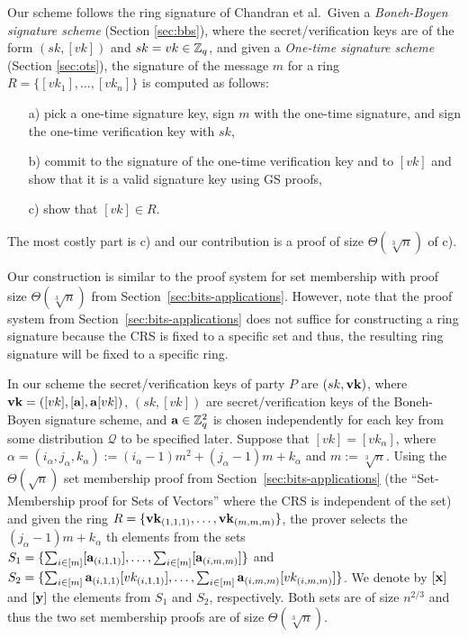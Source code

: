 Our scheme follows the ring signature of Chandran et al.~Given a \emph{Boneh-Boyen signature scheme} (Section \ref{sec:bbs}), where the secret/verification keys are of the form $(sk,[vk])$ and $sk=vk\in\mathbb{Z}_q$, and given a \emph{One-time signature scheme} (Section \ref{sec:ots}), the signature of the message $m$ for a ring $R=\{[vk_1],\ldots,[vk_n]\}$ is computed as follows:
\begin{itemize}
\item[a)] pick a one-time signature key, sign $m$ with the one-time signature, and sign the one-time verification key with $sk$,
\item[b)] commit to the signature of the one-time verification key and to $[vk]$ and show that it is a valid signature key using GS proofs,
\item[c)] show that $[vk]\in R$.
\end{itemize}
The most costly part is c) and our contribution is a proof of size $\Theta(\sqrt[3]{n})$ of c).

Our construction is similar to the proof system for set membership with proof size $\Theta(\sqrt[3]{n})$ from Section~\ref{sec:bits-applications}. However, note that the proof system from Section~\ref{sec:bits-applications} does not suffice for constructing a ring signature because the CRS is fixed to a specific set and thus, the resulting ring signature will be fixed to a specific ring. 

In our scheme the secret/verification keys of party $P$ are $(sk,\mathbf{vk})$, where $\mathbf{vk}=([vk],[\mathbf{a}],\mathbf{a}[vk])$, $(sk,[vk])$ are secret/verification keys of the Boneh-Boyen signature scheme, and $\mathbf{a}\in\mathbb{Z}_q^2$ is chosen independently for each key from some distribution $\mathcal{Q}$ to be specified later. Suppose that $[vk]=[vk_\alpha]$, where $\alpha=(i_\alpha,j_\alpha,k_\alpha):=(i_\alpha-1)m^2+(j_\alpha-1)m+k_\alpha$ and $m:=\sqrt[3]{n}$. Using the $\Theta(\sqrt{n})$ set membership proof from Section~\ref{sec:bits-applications} (the ``Set-Membership proof for Sets of Vectors'' where the CRS is independent of the set) and given the ring $R=\{\mathbf{vk}_{(1,1,1)},\ldots,\mathbf{vk}_{(m,m,m)}\}$, the prover selects the $(j_\alpha-1)m+k_\alpha$ th elements from the sets $S_1=\{\sum_{i\in[m]}[\mathbf{a}_{(i,1,1)}],\ldots,\sum_{i\in[m]}[\mathbf{a}_{(i,m,m)}]\}$ and $S_2=\{\sum_{i\in[m]}\mathbf{a}_{(i,1,1)}[vk_{(i,1,1)}],\ldots,\sum_{i\in[m]}\mathbf{a}_{(i,m,m)}[vk_{(i,m,m)}]\}$. We denote by $[\mathbf{x}]$ and $[\mathbf{y}]$ the elements from $S_1$ and $S_2$, respectively. Both sets are of size $n^{2/3}$ and thus the two set membership proofs are of size $\Theta(\sqrt[3]{n})$.
 

